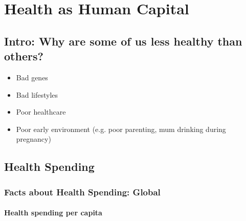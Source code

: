 \chapter[Health as Human Capital]{Health as Human Capital\raisebox{.3\baselineskip}{\normalsize\footnotemark}}


\section{Intro: Why are some of us less healthy than others?}

    \begin{itemize}
        \item Bad genes
        \item Bad lifestyles
        \item Poor healthcare 
        \item Poor early environment 
        (e.g. poor parenting, mum drinking during pregnancy)
   \end{itemize}    

\section{Health Spending}

    \subsection{Facts about Health Spending: Global}

        \subsubsection{Health spending per capita}


